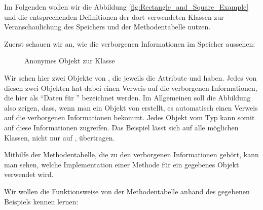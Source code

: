 \documentclass{tuda-pub}
\begin{document}
  \br

  Im Folgenden wollen wir die Abbildung \ref{fig:Rectangle_and_Square_Example} und die
  entsprechenden Definitionen der dort verwendeten Klassen zur Veranschaulichung des Speichers
  und der Methodentabelle nutzen.

  \br

  Zuerst schauen wir an, wie die verborgenen Informationen im Speicher aussehen:
  \begin{figure}[h]
    \centering
    \begin{memory}
    \end{memory}
    \caption{Anonymes Objekt zur Klasse }
  \end{figure}

  Wir sehen hier zwei Objekte von , die jeweils die Attribute
   und  haben. Jedes von diesen zwei Objekten hat dabei
  einen Verweis auf die verborgenen Informationen, die hier als \enquote{Daten für
  } bezeichnet werden. Im Allgemeinen soll die Abbildung also zeigen, dass,
  wenn man ein Objekt von  erstellt, es automatisch einen Verweis auf die
  verborgenen Informationen bekommt. Jedes Objekt vom Typ  kann somit auf
  diese Informationen zugreifen. Das Beispiel lässt sich auf alle möglichen Klassen, nicht nur
  auf , übertragen.

  \br

  Mithilfe der Methodentabelle, die zu den verborgenen Informationen gehört, kann man sehen,
  welche Implementation einer Methode für ein gegebenes Objekt verwendet wird.

  \br

  Wir wollen die Funktionsweise von der Methodentabelle anhand des gegebenen Beispiels kennen
  lernen:
\end{document}
